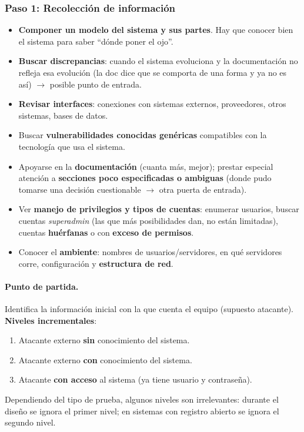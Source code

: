 \documentclass[../main.tex]{subfiles}
\begin{document}
\subsubsection{Paso 1: Recolección de información}

\begin{itemize}
    \item \textbf{Componer un modelo del sistema y sus partes}. Hay que conocer bien el
    sistema para saber ``dónde poner el ojo''.
    \item \textbf{Buscar discrepancias}: cuando el sistema evoluciona y la documentación no
    refleja esa evolución (la doc dice que se comporta de una forma y ya no es así)
    $\rightarrow$ posible punto de entrada.
    \item \textbf{Revisar interfaces}: conexiones con sistemas externos, proveedores, otros
    sistemas, bases de datos.
    \item Buscar \textbf{vulnerabilidades conocidas genéricas} compatibles con la tecnología
    que usa el sistema.
    \item Apoyarse en la \textbf{documentación} (cuanta más, mejor); prestar especial atención
    a \textbf{secciones poco especificadas o ambiguas} (donde pudo tomarse una decisión
    cuestionable $\rightarrow$ otra puerta de entrada).
    \item Ver \textbf{manejo de privilegios y tipos de cuentas}: enumerar usuarios, buscar
    cuentas \emph{superadmin} (las que más posibilidades dan, no están limitadas), cuentas
    \textbf{huérfanas} o con \textbf{exceso de permisos}.
    \item Conocer el \textbf{ambiente}: nombres de usuarios/servidores, en qué servidores
    corre, configuración y \textbf{estructura de red}.
\end{itemize}

\paragraph{Punto de partida.} Identifica la información inicial con la que cuenta el equipo
(supuesto atacante). \textbf{Niveles incrementales}:
\begin{enumerate}
    \item Atacante externo \textbf{sin} conocimiento del sistema.
    \item Atacante externo \textbf{con} conocimiento del sistema.
    \item Atacante \textbf{con acceso} al sistema (ya tiene usuario y contraseña).
\end{enumerate}
Dependiendo del tipo de prueba, algunos niveles son irrelevantes: durante el diseño se
ignora el primer nivel; en sistemas con registro abierto se ignora el segundo nivel.
\end{document}
